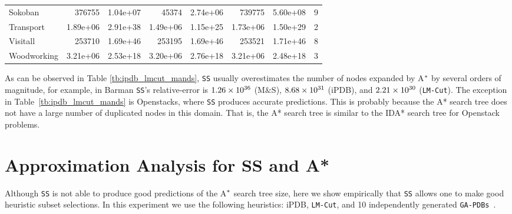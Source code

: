 \begin{table}[!htb]
\begin{tabular}{lrrrrrrr}
Sokoban              & 376755      & 1.04e+07   & 45374             & 2.74e+06          & 739775       & 5.60e+08    & 9                  \\
Transport            & 1.89e+06    & 2.91e+38   & 1.49e+06          & 1.15e+25          & 1.73e+06     & 1.50e+29    & 2                  \\
Visitall             & 253710      & 1.69e+46   & 253195            & 1.69e+46          & 253521       & 1.71e+46    & 8                  \\
Woodworking          & 3.21e+06    & 2.53e+18   & 3.20e+06          & 2.76e+18          & 3.21e+06     & 2.48e+18    & 3                  \\ \hline
\end{tabular}
\end{table}


As can be observed in Table \ref{tb:ipdb_lmcut_mands}, \texttt{SS} usually overestimates the number of nodes expanded by A$\sp{*}$ by several orders of magnitude, for example, in Barman %
\texttt{SS}'s relative-error is $1.26\times10\sp{36}$ (M$\&$S), $8.68\times10\sp{31}$ (iPDB), and $2.21\times10\sp{30}$ (\texttt{LM-Cut}). %
The exception in Table~\ref{tb:ipdb_lmcut_mands} is Openstacks, where \texttt{SS} produces accurate predictions. This is probably because the A* search tree does not have a large number of duplicated nodes in this domain. That is, the A* search tree is similar to the IDA* search tree for Openstack problems. 


\section{Approximation Analysis for SS and A*}

\noindent
Although \texttt{SS} is not able to produce good predictions of the A$\sp{*}$ search tree size, here we show empirically that \texttt{SS} allows one to make good heuristic subset selections. In this experiment we use the following heuristics: iPDB, \texttt{LM-Cut}, and 10 independently generated \texttt{GA-PDBs}~\cite{edelkamp2007automated}.

